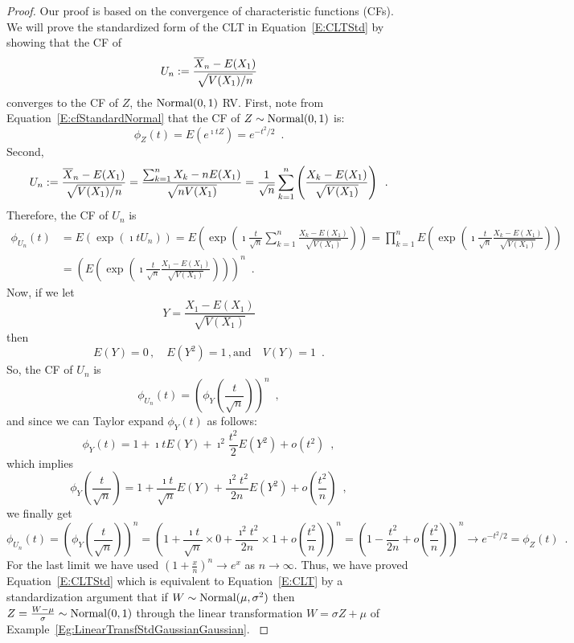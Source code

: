 \begin{prop}
{\normalsize
\begin{proof}
{
Our proof is based on the convergence of characteristic functions (CFs).  
We will prove the standardized form of the CLT in Equation~\eqref{E:CLTStd} by showing that the CF of
\[
U_n := \frac{\overline{X}_n-E(X_1)}{\sqrt{V(X_1)/n}}
\]
converges to the CF of $Z$, the $\mbox{{\rm Normal}}(0,1)$ RV.  
First, note from Equation~\eqref{E:cfStandardNormal} that the CF of $Z \sim \mbox{{\rm Normal}}(0,1)$ is:
\[
\phi_Z(t) = E \left( e^{\imath t Z}\right) = e^{-t^2/2} \enspace .
\]
Second, 
\[
U_n := \frac{\overline{X}_n-E(X_1)}{\sqrt{V(X_1)/n}} 
= \frac{\sum_{k=1}^n X_k - n E(X_1)}{\sqrt{nV(X_1)}}
= \frac{1}{\sqrt{n}} \sum_{k=1}^n \left(\frac{X_k - E(X_1)}{\sqrt{V(X_1)}}\right)\enspace .
\]
Therefore, the CF of $U_n$ is
\begin{align*}
\phi_{U_n}(t) 
&= E\left( \exp\left({\imath t U_n}\right)\right)
= E \left( \exp\left({\imath \frac{t}{\sqrt{n}}\sum_{k=1}^n \frac{X_k - E(X_1)}{\sqrt{V(X_1)}} }\right)\right)
= \prod_{k=1}^n E \left( \exp \left( \imath \frac{t}{\sqrt{n}} \frac{X_k - E(X_1)}{\sqrt{V(X_1)}} \right) \right)\\
&= \left( E \left( \exp \left( \imath \frac{t}{\sqrt{n}} \frac{X_1 - E(X_1)}{\sqrt{V(X_1)}} \right) \right)\right)^n \enspace .
\end{align*}
Now, if we let
\[
Y = \frac{X_1 - E(X_1)}{\sqrt{V(X_1)}}
\]
then 
\[
E(Y) = 0 \, , \quad E(Y^2)=1 \, , \text{and} \quad V(Y)=1 \enspace . 
\]
So, the CF of $U_n$ is
\[
\phi_{U_n}(t) = \left( \phi_Y\left(\frac{t}{\sqrt{n}}\right)\right)^n \enspace ,
\]
and since we can Taylor expand $\phi_Y(t)$ as follows: 
\[
\phi_Y(t) = 1 + \imath t E(Y) + \imath^2 \frac{t^2}{2} E(Y^2) + o(t^2) \enspace,
\]
which implies
\[
\phi_Y\left(\frac{t}{\sqrt{n}}\right) = 1 + \frac{\imath t}{\sqrt{n}} E(Y) + \frac{\imath^2 t^2}{2n}  E(Y^2) + o\left(\frac{t^2}{n}\right) \enspace,
\]
we finally get
\[
\phi_{U_n}(t) 
= \left( \phi_Y \left(\frac{t}{\sqrt{n}}\right) \right)^n
= \left( 1 +  \frac{\imath t}{\sqrt{n}} \times 0 + \frac{\imath^2 t^2}{2n}  \times 1 + o\left(\frac{t^2}{n}\right) \right)^n
= \left( 1 - \frac{t^2}{2n} + o\left(\frac{t^2}{n}\right) \right)^n
\to e^{-t^2/2} = \phi_Z(t) \enspace .
\]
For the last limit we have used $\left( 1+\frac{x}{n}\right)^n \to e^x$ as $n \to \infty$.  
Thus, we have proved Equation~\eqref{E:CLTStd} which is equivalent to Equation~\eqref{E:CLT} by a standardization argument that if $W \sim \mbox{{\rm Normal}}(\mu,\sigma^2)$ then $Z=\frac{W-\mu}{\sigma} \sim \mbox{{\rm Normal}}(0,1)$ through the linear transformation $W=\sigma Z + \mu$ of Example~\ref{Eg:LinearTransfStdGaussianGaussian}.
}
\end{proof}
}
\end{prop}


